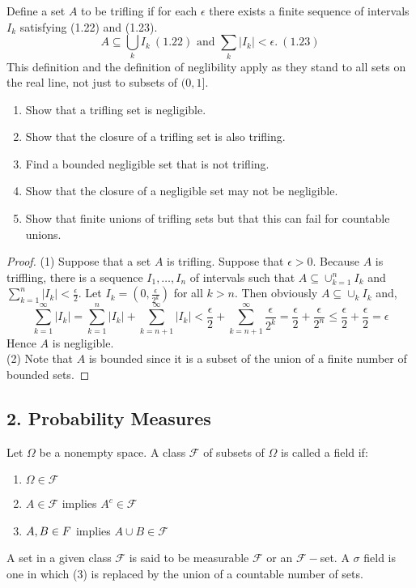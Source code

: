 \documentclass[12pt]{article}
\newcommand{\F}{\mathcal{F}}
\newcommand{\seq}{\subseteq}
\newcommand{\e}{\epsilon}
\newcommand{\mc}{\mathcal}
\newcommand{\un}{\cup}
\newenvironment{defn}[2][Definition]{\begin{trivlist}
\item[\hskip \labelsep {\bfseries #1}\hskip \labelsep {\bfseries #2.}]}{\end{trivlist}}
\newenvironment{exercise}[2][Exercise]{\begin{trivlist}
\item[\hskip \labelsep {\bfseries #1}\hskip \labelsep {\bfseries #2.}]}{\end{trivlist}}
\begin{document}
\begin{exercise}{1.3}
    Define a set $A$ to be trifling if for each $\e$ there exists a finite sequence of intervals $I_k$ satisfying (1.22) and (1.23).
    \[ A \seq \bigcup_{k} I_k \ (1.22) \text { and } \sum_{k} |I_k| < \e. \ (1.23) \]
    This definition and the definition of neglibility apply as they stand to all sets on the real line, not just to subsets of $(0, 1]$.
    \begin{enumerate}
        \item Show that a trifling set is negligible.
        \item Show that the closure of a trifling set is also trifling.
        \item Find a bounded negligible set that is not trifling.
        \item Show that the closure of a negligible set may not be negligible.
        \item Show that finite unions of trifling sets but that this can fail for countable unions.
    \end{enumerate}
\end{exercise}
\begin{proof}
    (1) Suppose that a set $A$ is trifling. Suppose that $\e > 0$. Because $A$ is triffling, there is a sequence $I_1, \ldots, I_n$ of intervals such that $A \seq \un_{k=1}^{n} I_k$ and $\sum_{k=1}^{n} |I_k| < \frac{\e}{2}$. Let $I_{k} = (0, \frac{\e}{2^{k}})$ for all $k > n$. Then obviously $A \seq \un_{k} I_k$ and,
    \[ \sum_{k=1}^{\infty} |I_k| = \sum_{k=1}^{n} |I_k| + \sum_{k=n+1}^{\infty} |I_k| < \frac{\e}{2}  + \sum_{k=n+1}^{\infty} \frac{\e}{2^{k}} = \frac{\e}{2} + \frac{\e}{2^{n}}  \leq \frac{\e}{2} + \frac{\e}{2} = \e    \]
    Hence $A$ is negligible. \\
    (2) Note that $A$ is bounded since it is a subset of the union of a finite number of bounded sets. 
\end{proof}

\pagebreak
\subsection*{2. Probability Measures}
\begin{defn}{1}
    Let $\Omega$ be a nonempty space. A class $\mc F$ of subsets of $\Omega$ is called a field if:
    \begin{enumerate}
        \item $\Omega \in \F$
        \item $A \in \F$ implies $A^c \in \F$
        \item $A, B \in \mc \F$ implies $A \un B \in \F$
    \end{enumerate}
    A set in a given class $\F$ is said to be measurable $\F$ or an $\F-$set. A $\sigma$ field is one in which (3) is replaced by the union of a countable number of sets.
\end{defn}
\end{document}
